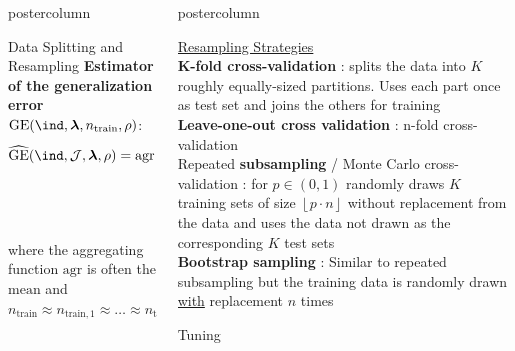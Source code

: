 \documentclass{beamer}
\newlength{\columnheight} %
\begin{document}
\begin{frame}[fragile]{}
\begin{columns}
\begin{column}{.31\textwidth}
\begin{beamercolorbox}[center]{postercolumn}
\begin{minipage}{.98\textwidth}
{\begin{myblock}{Data Splitting and Resampling}
\textbf{Estimator of the generalization error} $\mathrm{GE}(\ind, \bm{\lambda}, n_\mathrm{train}, \rho)$:
\begin{equation*}
\begin{split}
\widehat{\mathrm{GE}}(\ind, \mathcal{J}, \boldsymbol\lambda, \rho) = \mathrm{agr}\Big(
 &\rho\Big(\boldsymbol{y}_{J_{\mathrm{test},1}}, \boldsymbol{F}_{J_{\mathrm{test},1},\ind(\mathcal{D}_{\mathrm{train},1}, \bm{\lambda})}\Big), \\ &\large{\vdots} \\
& \rho\Big(\boldsymbol{y}_{J_{\mathrm{test},K}}, \boldsymbol{F}_{J_{\mathrm{test},K},
\ind(\mathcal{D}_{\mathrm{train},B}, \bm{\lambda})}\Big)
    \Big),
\end{split}
\end{equation*}
where the aggregating function $\mathrm{agr}$ is often the $\textrm{mean}$ and
$n_{\mathrm{train}} \approx n_{\mathrm{train},1} \approx \dots \approx n_{\mathrm{train},B}$ 
\end{myblock}
\vfill
				}
			\end{minipage}
		\end{beamercolorbox}
	\end{column}
	\begin{column}{.31\textwidth}
		\begin{beamercolorbox}[center]{postercolumn}
			\begin{minipage}{.98\textwidth}
				\parbox[t][\columnheight]{\textwidth}{
\underline{Resampling Strategies}\\

\textbf{K-fold cross-validation} : splits the data into $K$ roughly equally-sized partitions.
Uses each part once as test set and joins the others for training\\ 

\textbf{Leave-one-out cross validation}  : n-fold cross-validation\\

Repeated \textbf{subsampling} / Monte Carlo cross-validation : for $p \in (0,1)$ randomly draws $K$ training sets of size $\left \lfloor{p\cdot n}\right \rfloor $ without replacement from the data and uses the data not drawn as the corresponding $K$ test sets\\ 

\textbf{Bootstrap sampling} : Similar to repeated subsampling but the training data is randomly drawn \underline{with} replacement $n$ times\\ 
\begin{myblock}{Tuning}


\end{myblock}}
\end{minipage}
\end{beamercolorbox}
\end{column}
\end{columns}
\end{frame}
\end{document}
